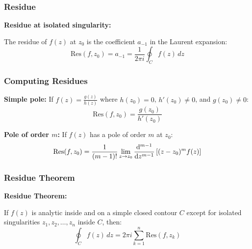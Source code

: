 \documentclass[12pt,a4paper]{article}
\begin{document}
\subsubsection{Residue}
\begin{formulabox}
\textbf{Residue at isolated singularity:}

The residue of $f(z)$ at $z_0$ is the coefficient $a_{-1}$ in the Laurent expansion:
\begin{equation}
\text{Res}(f, z_0) = a_{-1} = \frac{1}{2\pi i} \oint_C f(z) \, dz
\end{equation}
\end{formulabox}

\subsubsection{Computing Residues}
\begin{formulabox}
\textbf{Simple pole:} If $f(z) = \frac{g(z)}{h(z)}$ where $h(z_0) = 0$, $h'(z_0) \neq 0$, and $g(z_0) \neq 0$:
\begin{equation}
\text{Res}(f, z_0) = \frac{g(z_0)}{h'(z_0)}
\end{equation}

\textbf{Pole of order $m$:} If $f(z)$ has a pole of order $m$ at $z_0$:
\begin{equation}
\text{Res}(f, z_0) = \frac{1}{(m-1)!} \lim_{z \to z_0} \dv[m-1]{}{z}\left[(z - z_0)^m f(z)\right]
\end{equation}
\end{formulabox}

\subsubsection{Residue Theorem}
\begin{importantbox}
\textbf{Residue Theorem:}

If $f(z)$ is analytic inside and on a simple closed contour $C$ except for isolated singularities $z_1, z_2, \ldots, z_n$ inside $C$, then:
\begin{equation}
\oint_C f(z) \, dz = 2\pi i \sum_{k=1}^n \text{Res}(f, z_k)
\end{equation}
\end{importantbox}
\end{document}
